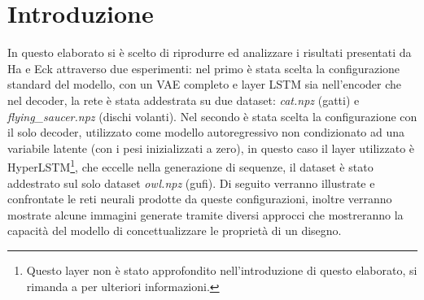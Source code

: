 \section{Introduzione} %
\label{sec:introduzione}
In questo elaborato si è scelto di riprodurre ed analizzare i risultati presentati da Ha e Eck attraverso due esperimenti: nel primo è stata scelta la configurazione standard del modello, con un VAE completo e layer LSTM sia nell'encoder che nel decoder, la rete è stata addestrata su due dataset: \textit{cat.npz} (gatti) e \textit{flying\_saucer.npz} (dischi volanti). Nel secondo è stata scelta la configurazione con il solo decoder, utilizzato come modello autoregressivo non condizionato ad una variabile latente (con i pesi inizializzati a zero), in questo caso il layer utilizzato è HyperLSTM\footnote{Questo layer non è stato approfondito nell'introduzione di questo elaborato, si rimanda a \cite{hyperlstm} per ulteriori informazioni.}, che eccelle nella generazione di sequenze, il dataset è stato addestrato sul solo dataset \textit{owl.npz} (gufi). Di seguito verranno illustrate e confrontate le reti neurali prodotte da queste configurazioni, inoltre verranno mostrate alcune immagini generate tramite diversi approcci che mostreranno la capacità del modello di concettualizzare le proprietà di un disegno.

